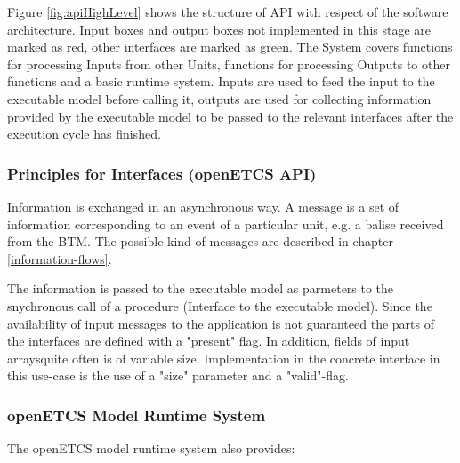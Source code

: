 \documentclass{template/openetcs_report}
\begin{document}
Figure \ref{fig:apiHighLevel} shows the structure of API with respect of the software architecture. Input boxes and output boxes not implemented in this stage are marked as red, other interfaces are marked as green. The System covers functions for processing Inputs from other Units, functions for processing Outputs to other functions and a basic runtime system. Inputs are used to feed the input to the executable model before calling it, outputs are used for collecting information provided by the executable model to be passed to the relevant interfaces after the execution cycle has finished.

\subsubsection{Principles for Interfaces (openETCS \gls{API})}


Information  is exchanged  in an asynchronous way. A message is a set
of information corresponding to an event of a particular unit, e.g. a
balise received from the \gls{BTM}. The possible kind of messages are
described in chapter \ref{information-flows}.

The information is passed to the executable model as parmeters to the snychronous call of a procedure (Interface to the executable model). Since the availability of input messages to the application is not guaranteed the parts of the interfaces are defined with a "present" flag. In addition, fields of input arraysquite often is of variable size. Implementation in the concrete interface in this use-case is the use of a "size" parameter and a "valid"-flag.


\subsubsection{openETCS Model Runtime System}
The openETCS model runtime system also provides:
\end{document}
